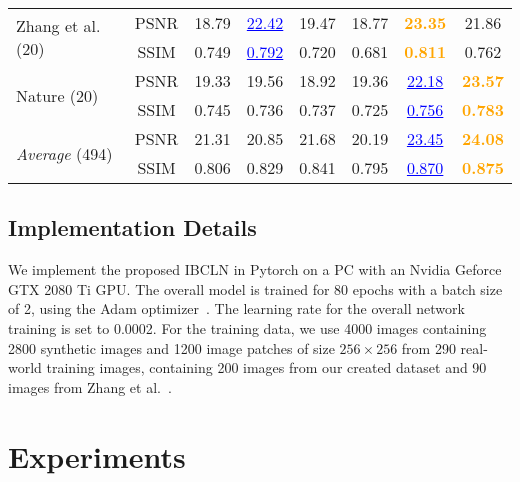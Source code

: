 \documentclass[10pt,twocolumn,letterpaper]{article}
\begin{document}
\begin{table*}[!htbp]
{\begin{tabular}{lccccccc}
                
                
                
                \multirow{2}{*}{Zhang et al. (20)}
                &PSNR&18.79&\textcolor{blue}{\underline{22.42}}&19.47&18.77& \textcolor{orange}{\textbf{23.35}}&21.86\\
                &SSIM&0.749&\textcolor{blue}{\underline{0.792}}&0.720&0.681& \textcolor{orange}{\textbf{0.811}}& 0.762\\
                \hline
                \multirow{2}{*}{Nature (20)}
                &PSNR& 19.33&19.56&18.92&19.36&\textcolor{blue}{\underline{22.18}}& \textcolor{orange}{\textbf{23.57}}  \\
                &SSIM&   0.745 &0.736 &0.737&0.725&\textcolor{blue}{\underline{0.756}}&\textcolor{orange}{\textbf{0.783}}\\
                \hline
                \multirow{2}{*}{\emph{Average} (494)} 
                &PSNR&21.31&20.85&21.68&20.19&\textcolor{blue}{\underline{23.45}}&\textcolor{orange}{\textbf{24.08}}\\
                &SSIM&0.806&0.829&0.841 &0.795&\textcolor{blue}{\underline{0.870}}&\textcolor{orange}{\textbf{0.875}}\\
                \bottomrule
        \end{tabular}}
        \label{tb:method-com}
        \vspace{2pt}
    \end{table*}

\subsection{Implementation Details}
We implement the proposed IBCLN in Pytorch on a PC with an Nvidia Geforce GTX 2080 Ti GPU. The overall model is trained for 80 epochs with a batch size of 2, using the Adam optimizer~\cite{kingma2014adam}. The learning rate for the overall network training is set to 0.0002. For the training data, we use 4000 images containing 2800 synthetic images and 1200 image patches of size $256 \times 256$ from 290 real-world training images, containing 200 images from our created dataset and 90 images from Zhang et al.~\cite{zhang2018single}.

\section{Experiments}
\end{document}
